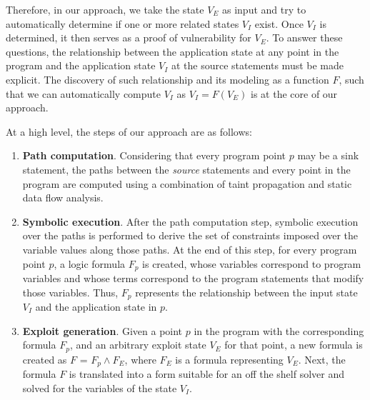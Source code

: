 {\color{orange} Therefore, in our approach, we take the state $V_E$ as input and try to automatically determine if one or more related states $V_I$ exist.} Once $V_I$ is determined, it then serves as a proof of vulnerability for $V_E$. To answer these questions, the relationship between the application state at any point in the program and the application state $V_I$ at the source statements must be made explicit. The discovery of such relationship and its modeling as a function $F$, such that we can automatically compute $V_I$ as $V_I = F(V_E)$ is at the core of our approach. 

At a high level, the steps of our approach are as follows:
\begin{enumerate}
	\item \textbf{Path computation}. Considering that every program point $p$ may be a sink statement, the paths between the \textit{source} statements and every point in the program are computed using a combination of taint propagation and static data flow analysis. 
	\item \textbf{Symbolic execution}. After the path computation step, symbolic execution over the paths is performed to derive the set of constraints imposed over the variable values along those paths. At the end of this step, for every program point $p$, a logic formula $F_p$ is created, whose variables correspond to program variables and whose terms correspond to the program statements that modify those variables. Thus, $F_p$ represents the relationship between the input state $V_I$ and the application state in $p$.
	\item \textbf{Exploit generation}. Given a point $p$ in the program with the corresponding formula $F_p$, and an arbitrary exploit state $V_E$ for that point, a new formula is created as $F$ = $F_p \wedge F_E$, where $F_E$ is a formula representing $V_E$. Next, the formula $F$ is translated into a form suitable for an off the shelf solver and solved for the variables of the state $V_I$. 
\end{enumerate}

